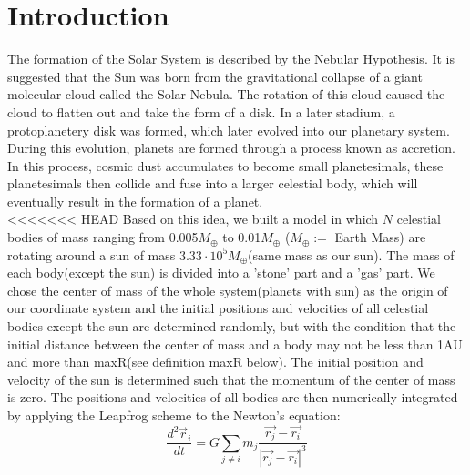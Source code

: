 \section{Introduction}
The formation of the Solar System is described by the Nebular Hypothesis. It is suggested that the Sun was born from the gravitational collapse of a giant molecular cloud called the Solar Nebula. 
The rotation of this cloud caused the cloud to flatten out and take the form of a disk. In a later stadium, a protoplanetery disk was formed, which later evolved into our planetary system.
During this evolution, planets are formed through a process known as accretion.
In this process, cosmic dust accumulates to become small planetesimals, these planetesimals then collide and fuse into a larger celestial body, which will eventually result in the formation of a planet.\\

<<<<<<< HEAD
Based on this idea, we built a model in which $N$ celestial bodies of mass ranging from 0.005$M_{\oplus}$ to 0.01$M_{\oplus}$ ($M_{\oplus}:=$ Earth Mass) are rotating around a sun of mass $3.33\cdot 10^5 M_{\oplus}$(same mass as our sun). The mass of each body(except the sun) is divided into a 'stone' part and a 'gas' part. We chose the center of mass of the whole system(planets with sun) as the origin of our coordinate system and the initial positions and velocities of all celestial bodies except the sun are determined randomly, but with the condition that the initial distance between the center of mass and a body may not be less than 1AU and more than maxR(see definition maxR below). The initial position and velocity of the sun is determined such that the momentum of the center of mass is zero. The positions and velocities of all bodies are then numerically integrated by applying the Leapfrog scheme to the Newton's equation:
\[\frac{d^2\vec{r}_i}{dt}=G\sum_{j\neq i}m_j\frac{\vec{r_j}-\vec{r_i}}{|\vec{r_j}-\vec{r_i}|^3}\]

